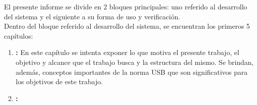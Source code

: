 El presente informe se divide en 2 bloques principales: uno referido al desarrollo del sistema y el siguiente a su forma de uso y verificación.\\

Dentro del bloque referido al desarrollo del sistema, se encuentran los primeros 5 capítulos:

\begin{enumerate}
	\item {\bf {}:} En este capítulo se intenta exponer lo que motiva el presente trabajo, el objetivo y alcance que el trabajo busca y la estructura del mismo. Se brindan, además, conceptos importantes de la norma USB que son significativos para los objetivos de este trabajo.
	\item {\bf {}:}
\end{enumerate}